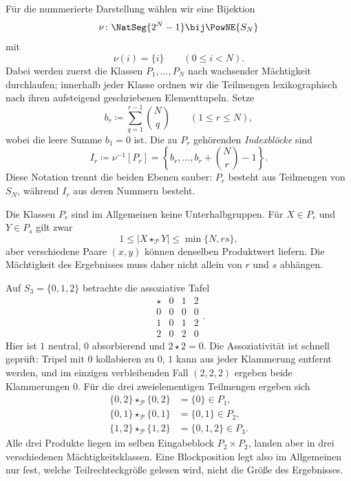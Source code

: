 \documentclass[main.tex]{subfiles}
\begin{document}
Für die nummerierte Darstellung wählen wir eine Bijektion
\[
  \nu\colon
  \NatSeg{2^N-1}
  \bij
  \PowNE{S_N}
\]
mit
\[
  \nu(i)=\{i\}
  \qquad(0\leq i<N).
\]
Dabei werden zuerst die Klassen \(P_1,\ldots,P_N\) nach wachsender
Mächtigkeit durchlaufen; innerhalb jeder Klasse ordnen wir die Teilmengen
lexikographisch nach ihren aufsteigend geschriebenen Elementtupeln.  Setze
\[
  b_r\coloneqq
  \sum_{q=1}^{r-1}\binom{N}{q}
  \qquad(1\leq r\leq N),
\]
wobei die leere Summe \(b_1=0\) ist.  Die zu \(P_r\) gehörenden
\emph{Indexblöcke} sind
\[
  \boxed{
  I_r
  \coloneqq
  \nu^{-1}[P_r]
  =
  \left\{
    b_r,\ldots,b_r+\binom{N}{r}-1
  \right\}.}
\]
Diese Notation trennt die beiden Ebenen sauber: \(P_r\) besteht aus
Teilmengen von \(S_N\), während \(I_r\) aus deren Nummern besteht.

Die Klassen \(P_r\) sind im Allgemeinen keine Unterhalbgruppen.  Für
\(X\in P_r\) und \(Y\in P_s\) gilt zwar
\[
  1\leq|X\star_{\mathcal P}Y|
  \leq\min\{N,rs\},
\]
aber verschiedene Paare \((x,y)\) können denselben Produktwert liefern.  Die
Mächtigkeit des Ergebnisses muss daher nicht allein von \(r\) und \(s\)
abhängen.

\begin{example}
Auf \(S_3=\{0,1,2\}\) betrachte die assoziative Tafel
\[
\begin{array}{c|ccc}
\star&0&1&2\\\hline
0&0&0&0\\
1&0&1&2\\
2&0&2&0
\end{array}.
\]
Hier ist \(1\) neutral, \(0\) absorbierend und \(2\star2=0\).  Die
Assoziativität ist schnell geprüft: Tripel mit \(0\) kollabieren zu \(0\),
\(1\) kann aus jeder Klammerung entfernt werden, und im einzigen verbleibenden
Fall \((2,2,2)\) ergeben beide Klammerungen \(0\).  Für die drei
zweielementigen Teilmengen ergeben sich
\[
\begin{aligned}
  \{0,2\}\star_{\mathcal P}\{0,2\}&=\{0\}\in P_1,\\
  \{0,1\}\star_{\mathcal P}\{0,1\}&=\{0,1\}\in P_2,\\
  \{1,2\}\star_{\mathcal P}\{1,2\}&=\{0,1,2\}\in P_3.
\end{aligned}
\]
Alle drei Produkte liegen im selben Eingabeblock \(P_2\times P_2\), landen
aber in drei verschiedenen Mächtigkeitsklassen.  Eine Blockposition legt
also im Allgemeinen nur fest, welche Teilrechteckgröße gelesen wird, nicht
die Größe des Ergebnisses.
\end{example}
\end{document}
